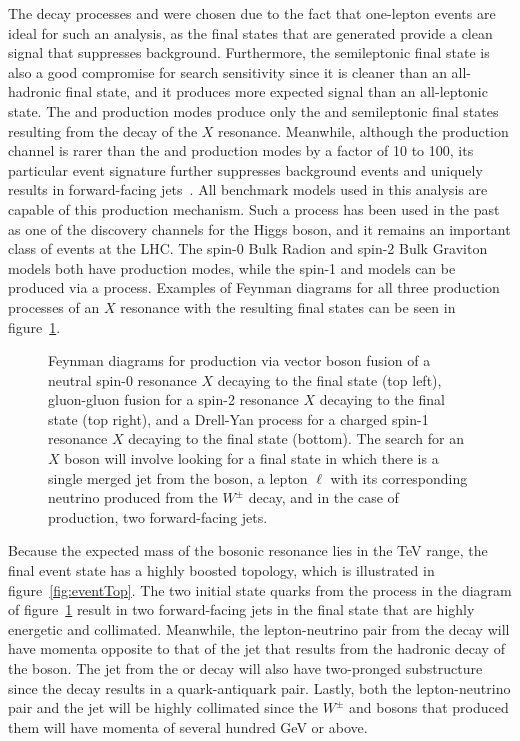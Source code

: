 The decay processes \XtoWVtolnuqqbarpr and \XtoWHtolnubbbar were chosen due to the fact that one-lepton events are ideal for such an analysis, as the final states that are generated provide a clean signal that suppresses background.
Furthermore, the semileptonic final state is also a good compromise for search sensitivity since it is cleaner than an all-hadronic final state, and it produces more expected signal than an all-leptonic state.
The \ggF and \DY production modes produce only the \lnuqqbarprp and \lnubbbar semileptonic final states resulting from the decay of the $X$ resonance.
Meanwhile, although the \VBF production channel is rarer than the \ggF and \DY production modes by a factor of 10 to 100, its particular event signature further suppresses background events and uniquely results in forward-facing jets~\cite{rauch2016vectorboson}.
All benchmark models used in this analysis are capable of this production mechanism.
Such a process has been used in the past as one of the discovery channels for the Higgs boson, and it remains an important class of events at the LHC.
The spin-0 Bulk Radion and spin-2 Bulk Graviton models both have \ggF production modes, while the spin-1 \Wpr and \Zpr models can be produced via a \DY process.
Examples of Feynman diagrams for all three production processes of an $X$ resonance with the resulting final states can be seen in figure~\ref{fig:productFeynman}.

\begin{figure}[htbp]
  \centering
  
  \caption{
    Feynman diagrams for production via vector boson fusion of a neutral spin-0 resonance $X$ decaying to the final state \lnuqqbarpr (top left), gluon-gluon fusion for a spin-2 resonance $X$ decaying to the final state \lnuqqbarpr (top right), and a Drell-Yan process for a charged spin-1 resonance $X$ decaying to the final state \lnubbbar (bottom).
    The search for an $X$ boson will involve looking for a final state in which there is a single merged jet from the \VorH boson, a lepton $\ell$ with its corresponding neutrino produced from the $W^\pm$ decay, and in the case of \VBF production, two forward-facing jets.
  }
  \label{fig:productFeynman}
\end{figure}

Because the expected mass of the bosonic resonance lies in the TeV range, the final event state has a highly boosted topology, which is illustrated in figure~\ref{fig:eventTop}.
The two initial state quarks from the \VBF process in the diagram of figure~\ref{fig:productFeynman} result in two forward-facing jets in the final state that are highly energetic and collimated.
Meanwhile, the lepton-neutrino pair from the \Wtolnu decay will have momenta opposite to that of the jet that results from the hadronic decay of the \VorH boson.
The jet from the \Vtoqqbarpr or \Htobbbar decay will also have two-pronged substructure since the decay results in a quark-antiquark pair.
Lastly, both the lepton-neutrino pair and the jet will be highly collimated since the $W^\pm$ and \VorH bosons that produced them will have momenta of several hundred GeV or above.

